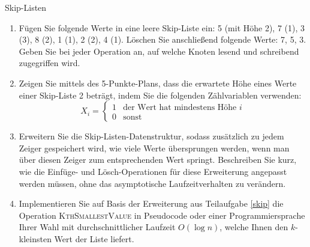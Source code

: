 \documentclass[11pt,a4paper]{article}
\begin{document}
\begin{aufgabe}{2}{Skip-Listen}
    \begin{enumerate}[label=\alph*)]
        \item Fügen Sie folgende Werte in eine leere Skip-Liste ein:
        5 (mit Höhe 2), 7 (1), 3 (3), 8 (2), 1 (1), 2 (2), 4 (1).
        Löschen Sie anschließend folgende Werte: 7, 5, 3.
        Geben Sie bei jeder Operation an, auf welche Knoten lesend und schreibend zugegriffen wird.
        \item Zeigen Sie mittels des 5-Punkte-Plans, dass die erwartete Höhe eines Werte einer Skip-Liste 2 beträgt, indem Sie die folgenden Zählvariablen verwenden:
        \begin{equation*}
            X_i = \begin{cases}
                1 & \text{der Wert hat mindestens Höhe $i$} \\
                0 & \text{sonst}
            \end{cases}
        \end{equation*}
        \item\label{skip} 
        Erweitern Sie die Skip-Listen-Datenstruktur, sodass zusätzlich zu jedem Zeiger gespeichert wird, wie viele Werte übersprungen werden, wenn man über diesen Zeiger zum entsprechenden Wert springt.
        Beschreiben Sie kurz, wie die Einfüge- und Lösch-Operationen für diese Erweiterung angepasst werden müssen, ohne das asymptotische Laufzeitverhalten zu verändern.

        \item 
        Implementieren Sie auf Basis der Erweiterung aus Teilaufgabe \ref*{skip} die Operation \textsc{KthSmallestValue} in Pseudocode oder einer Programmiersprache Ihrer Wahl mit durchschnittlicher Laufzeit $O(\log n)$, welche Ihnen den $k$-kleinsten Wert der Liste liefert.
    \end{enumerate}
\end{aufgabe}
\end{document}
